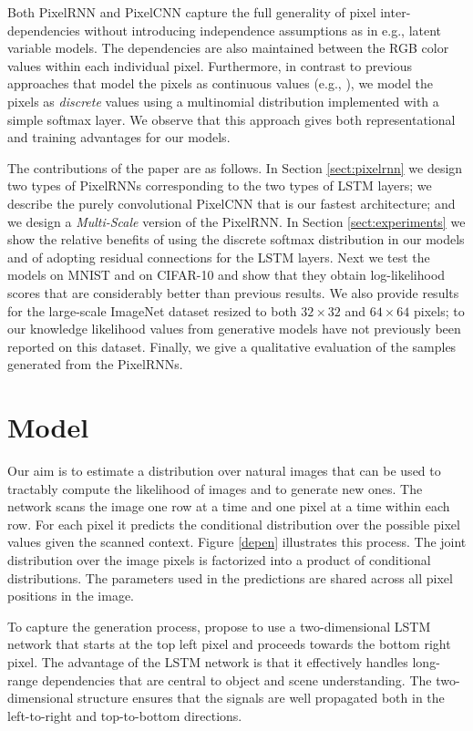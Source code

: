 \documentclass{article}
\begin{document}
Both PixelRNN and PixelCNN capture the full generality of pixel inter-dependencies without introducing independence assumptions as in e.g., latent variable models. The dependencies are also maintained between the RGB color values within each individual pixel. 
Furthermore, in contrast to previous approaches that model the pixels as continuous values (e.g., \citet{theis2015generative, gregor2013deep}), we model the pixels as \emph{discrete} values using a multinomial distribution implemented with a simple softmax layer. We observe that this approach gives both representational and training advantages for our models.


The contributions of the paper are as follows. In Section \ref{sect:pixelrnn} we design two types of PixelRNNs corresponding to the two types of LSTM layers; we describe the purely convolutional PixelCNN that is our fastest architecture; and we design a \emph{Multi-Scale} version of the PixelRNN.
In Section \ref{sect:experiments} we show the relative benefits of using the discrete softmax distribution in our models and of adopting residual connections for the LSTM layers. Next we test the models on MNIST and on CIFAR-10 and show that they obtain log-likelihood scores that are considerably better than previous results. We also provide results for the large-scale ImageNet dataset resized to both $32 \times 32$ and $64 \times 64$ pixels; to our knowledge likelihood values from generative models have not previously been reported on this dataset. Finally, we give a qualitative evaluation of the samples generated from the PixelRNNs. 


 \section{Model}
\label{framework}


Our aim is to estimate a distribution over natural images that can be used to tractably compute the likelihood of images and to generate new ones. The network scans the image one row at a time and one pixel at a time within each row.  For each pixel it predicts the conditional distribution over the possible pixel values given the scanned context. Figure \ref{depen} illustrates this process. The joint distribution over the image pixels is factorized into a product of conditional distributions. The parameters used in the predictions are shared across all pixel positions in the image. 

To capture the generation process, \citet{theis2015generative} propose to use a two-dimensional LSTM network \cite{graves2009offline} that starts at the top left pixel and proceeds towards the bottom right pixel. The advantage of the LSTM network is that it effectively handles long-range dependencies that are central to object and scene understanding. The two-dimensional structure ensures that the signals are well propagated both in the left-to-right and top-to-bottom directions. 
\end{document}
